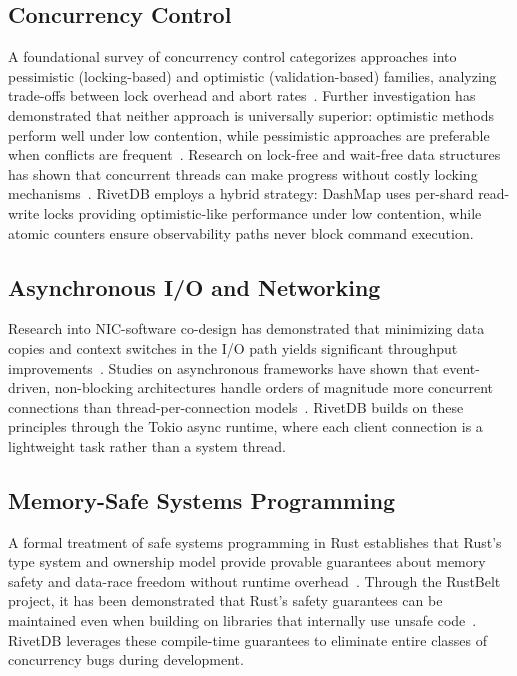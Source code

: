 \documentclass[conference,a4paper]{IEEEtran}
\begin{document}
\subsection{Concurrency Control}

A foundational survey of concurrency control categorizes approaches into pessimistic (locking-based) and optimistic (validation-based) families, analyzing trade-offs between lock overhead and abort rates~\cite{bernstein1981}. Further investigation has demonstrated that neither approach is universally superior: optimistic methods perform well under low contention, while pessimistic approaches are preferable when conflicts are frequent~\cite{graefe2016}. Research on lock-free and wait-free data structures has shown that concurrent threads can make progress without costly locking mechanisms~\cite{petrank2014}. RivetDB employs a hybrid strategy: DashMap uses per-shard read-write locks providing optimistic-like performance under low contention, while atomic counters ensure observability paths never block command execution.

\subsection{Asynchronous I/O and Networking}

Research into NIC-software co-design has demonstrated that minimizing data copies and context switches in the I/O path yields significant throughput improvements~\cite{skiadopoulos2024}. Studies on asynchronous frameworks have shown that event-driven, non-blocking architectures handle orders of magnitude more concurrent connections than thread-per-connection models~\cite{yadav2024}. RivetDB builds on these principles through the Tokio async runtime, where each client connection is a lightweight task rather than a system thread.

\subsection{Memory-Safe Systems Programming}

A formal treatment of safe systems programming in Rust establishes that Rust's type system and ownership model provide provable guarantees about memory safety and data-race freedom without runtime overhead~\cite{jung2021}. Through the RustBelt project, it has been demonstrated that Rust's safety guarantees can be maintained even when building on libraries that internally use unsafe code~\cite{jung2021}. RivetDB leverages these compile-time guarantees to eliminate entire classes of concurrency bugs during development.
\end{document}
